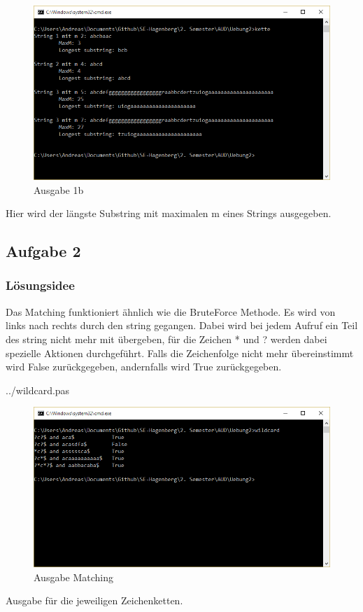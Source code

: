 \documentclass[a4papr,12pt]{article}
\begin{document}
\begin{figure}[H]
	\centering
	\includegraphics[scale=0.75]{./pictures/1b.png}
	\caption{Ausgabe 1b}
	\label{fig: Kette1b}
\end{figure}
Hier wird der längste Substring mit maximalen m eines Strings ausgegeben.

\newpage
\subsection*{Aufgabe 2}
\subsubsection*{Lösungsidee}
Das Matching funktioniert ähnlich wie die BruteForce Methode. Es wird von links nach rechts durch den string gegangen. Dabei wird bei jedem Aufruf ein Teil des string nicht mehr mit übergeben, für die Zeichen \grqq{}*\grqq{} und \grqq{}?\grqq{} werden dabei spezielle Aktionen durchgeführt. Falls die Zeichenfolge nicht mehr übereinstimmt wird False zurückgegeben, andernfalls wird True zurückgegeben.
\newline

 {../wildcard.pas}
\begin{figure}[H]
	\centering
	\includegraphics[scale=0.75]{./pictures/2arecursive.png}
	\caption{Ausgabe Matching}
	\label{fig: Matching}
\end{figure}
Ausgabe für die jeweiligen Zeichenketten.
\end{document}
